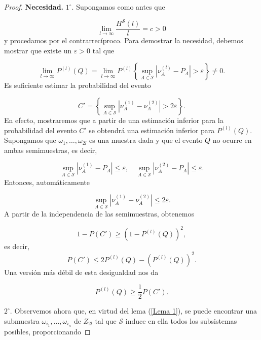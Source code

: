 \documentclass{report}
\begin{document}
\begin{proof}
\textbf{Necesidad.}\newline
\( 1^\circ \). Supongamos como antes que

\begin{equation}\label{eq 23}
\lim_{l \to \infty} \frac{H^{\mathcal{S}}(l)}{l} = c > 0
\end{equation}
y procedamos por el contrarrecíproco. Para demostrar la necesidad, debemos mostrar que existe un \( \varepsilon > 0 \) tal que

\begin{equation*}
\lim_{l \to \infty} P^{(l)}(Q) = \lim_{l \to \infty} P^{(l)} \left\{ \sup_{A \in \mathcal{S}} \left| \nu_A^{(l)} - P_A \right| > \varepsilon \right\} \neq 0.
\end{equation*}
Es suficiente estimar la probabilidad del evento

\begin{equation*}
C' = \left\{ \sup_{A \in \mathcal{S}} \left| \nu_A^{(1)} - \nu_A^{(2)} \right| > 2\varepsilon \right\}.
\end{equation*}
En efecto, mostraremos que a partir de una estimación inferior para la probabilidad del evento \( C' \) se obtendrá una estimación inferior para \( P^{(l)}(Q) \). Supongamos que \( \omega_1, \dots, \omega_{2l} \) es una muestra dada y que el evento \( Q \) no ocurre en ambas semimuestras, es decir,

\begin{equation*}
\sup_{A \in \mathcal{S}} \left| \nu_A^{(1)} - P_A \right| \leq \varepsilon, \quad \sup_{A \in \mathcal{S}} \left| \nu_A^{(2)} - P_A \right| \leq \varepsilon.
\end{equation*}
Entonces, automáticamente

\begin{equation*}
\sup_{A \in \mathcal{S}} \left| \nu_A^{(1)} - \nu_A^{(2)} \right| \leq 2\varepsilon.
\end{equation*}
A partir de la independencia de las semimuestras, obtenemos

\begin{equation*}
1 - P(C') \geq (1 - P^{(l)}(Q))^2, 
\end{equation*}
es decir, 
\[
P(C') \leq 2P^{(l)}(Q) - \left(P^{(l)}(Q)\right)^2.
\]
Una versión más débil de esta desigualdad nos da

\begin{equation*}
P^{(l)}(Q) \geq \frac{1}{2} P(C').
\end{equation*}

\bigskip
\( 2^\circ \). Observemos ahora que, en virtud del lema (\ref{Lema 1}), se puede encontrar una submuestra \( \omega_{i_1}, \dots, \omega_{i_n} \) de \( Z_{2l} \) tal que \( \mathcal{S} \) induce en ella todos los subsistemas posibles, proporcionando


\end{proof}
\end{document}
